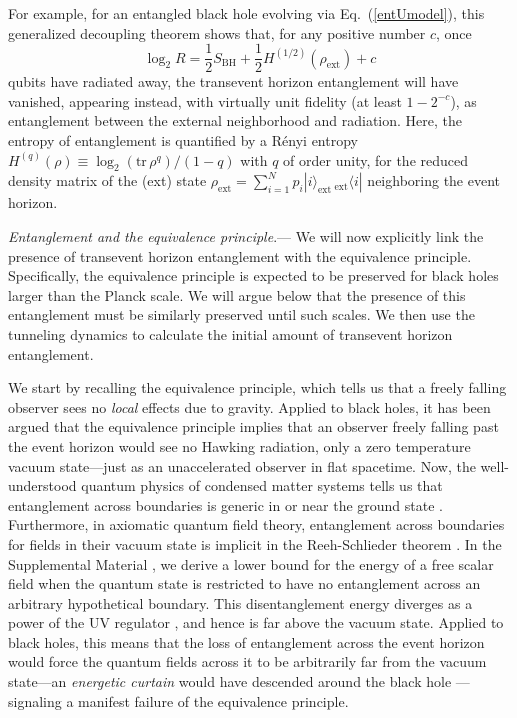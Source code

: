\documentclass[twocolumn,aps,showpacs,prl]{revtex4}
\begin{document}
For example, for an entangled black hole evolving via
Eq.~(\ref{entUmodel}), this generalized decoupling theorem shows that,
for any positive number $c$, once
\begin{equation}
\log_2 R=\frac{1}{2}S_{\text{BH}}+\frac{1}{2}H^{(1/2)}(\rho_{\text{ext}})+c
\label{entVanishing}
\end{equation}
qubits have radiated away, the transevent horizon entanglement
will have vanished, appearing instead, with virtually unit fidelity
(at least $1-2^{-c}$), as entanglement between the external neighborhood
and radiation. Here, the entropy of entanglement is quantified by a
R\'enyi entropy
$H^{(q)}(\rho) \equiv \log_2({\text{tr}}\, \rho^q)/(1-q)$ with $q$
of order unity, for the reduced density matrix of the (ext) state
$\rho_{\text{ext}}=\sum_{i=1}^N p_i |i\rangle_{\text{ext}}\,
{}_{\text{ext}} \langle i|$ neighboring the event horizon.

{\it Entanglement and the equivalence principle}.---%
We will now explicitly link the presence of transevent horizon 
entanglement with the equivalence principle. Specifically, the 
equivalence principle is expected to be preserved for black holes 
larger than the Planck scale. We will argue below that the presence
of this entanglement must be similarly preserved until such scales.
We then use the tunneling dynamics to calculate the initial amount
of transevent horizon entanglement.
  
We start by recalling the equivalence principle, 
which tells us that a freely falling observer sees no {\it local\/} 
effects due to gravity. Applied to black holes, it has been
argued \cite{Susskind93} that the equivalence principle implies that
an observer freely falling past the event horizon would see no Hawking
radiation, only a zero temperature vacuum state---just as an
unaccelerated observer in flat spacetime. Now, the well-understood quantum
physics of condensed matter systems tells us that entanglement across
boundaries is generic in or near the ground state \cite{Eisert09}.
Furthermore, in axiomatic quantum field theory, entanglement across
boundaries for fields in their vacuum state is implicit in the
Reeh-Schlieder theorem \cite{Schlieder}. 
In the Supplemental Material \cite{SM}, we derive a lower bound for the
energy of a free scalar field when the quantum state is restricted
to have no entanglement across an arbitrary hypothetical boundary.
This disentanglement energy diverges as a power of the UV regulator
\cite{SM}, and hence is far above the vacuum state. Applied to black
holes, this means that the loss of entanglement across the event horizon
%
would force the quantum fields across it to be arbitrarily far from the
vacuum state---an {\it energetic curtain\/} would have descended around
the black hole \cite{SLB2009}---signaling
%
a manifest failure of the equivalence principle.
\end{document}
